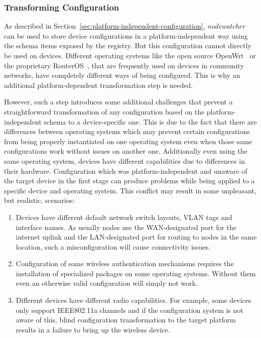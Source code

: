 \documentclass[5p,sort&compress]{elsarticle}
\newcommand{\nodewatcher}{\textit{nodewatcher}}
\begin{document}
\subsubsection{Transforming Configuration}

As described in Section~\ref{sec:platform-independent-configuration}, \nodewatcher{} can be used to store device configurations in a platform-independent way using the schema items exposed by the registry.
But this configuration cannot directly be used on devices.
Different operating systems like the open source OpenWrt~\cite{OpenWrt_2004} or the proprietary RouterOS~\cite{RouterOS_1995}, that are frequently used on devices in community networks, have completely different ways of being configured.
This is why an additional platform-dependent transformation step is needed.

However, such a step introduces some additional challenges that prevent a straightforward transformation of any configuration based on the platform-independent schema to a device-specific one.
This is due to the fact that there are differences between operating systems which may prevent certain configurations from being properly instantiated on one operating system even when those same configurations work without issues on another one.
Additionally even using the same operating system, devices have different capabilities due to differences in their hardware.
Configuration which was platform-independent and unaware of the target device in the first stage can produce problems while being applied to a specific device and operating system.
This conflict may result in some unpleasant, but realistic, scenarios:
\begin{enumerate}[label=\roman*)]
\item Devices have different default network switch layouts, VLAN tags and interface names.
As usually nodes use the WAN-designated port for the internet uplink and the LAN-designated port for routing to nodes in the same location, such a misconfiguration will cause connectivity issues.

\item Configuration of some wireless authentication mechanisms requires the installation of specialized packages on some operating systems.
Without them even an otherwise valid configuration will simply not work.

\item Different devices have different radio capabilities.
For example, some devices only support IEEE802.11a channels and if the configuration system is not aware of this, blind configuration transformation to the target platform results in a failure to bring up the wireless device.
\end{enumerate}
\end{document}
